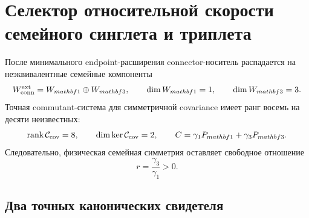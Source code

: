 \chapter{Селектор относительной скорости семейного синглета и триплета}
\label{ch:v8-baryon-c0-family-triplet-singlet-relative-rate-selector-gate}

После минимального endpoint-расширения connector-носитель распадается на
неэквивалентные семейные компоненты
\begin{equation}
 W_{\rm conn}^{\rm ext}=W_{mathbf1}\oplus W_{mathbf3},
 \qquad \dim W_{mathbf1}=1,
 \qquad \dim W_{mathbf3}=3.
 \label{eq:v8-baryon-c0-singlet-triplet-connector-decomposition}
\end{equation}
Точная commutant-система для симметричной covariance имеет ранг восемь на
десяти неизвестных:
\begin{equation}
 \operatorname{rank}\mathcal C_{\rm cov}=8,
 \qquad \dim\ker\mathcal C_{\rm cov}=2,
 \qquad C=\gamma_1P_{mathbf1}+\gamma_3P_{mathbf3}.
 \label{eq:v8-baryon-c0-singlet-triplet-covariance-commutant}
\end{equation}
Следовательно, физическая семейная симметрия оставляет свободное отношение
\begin{equation}
 r=\frac{\gamma_3}{\gamma_1}>0.
 \label{eq:v8-baryon-c0-singlet-triplet-relative-rate}
\end{equation}

\section{Два точных канонических свидетеля}

